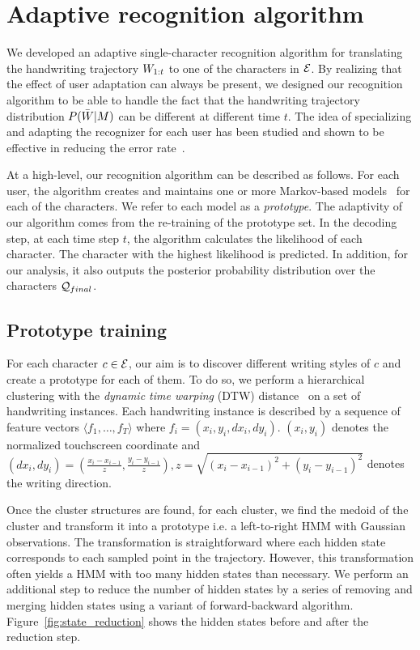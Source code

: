 \documentclass{sigchi}
\begin{document}
\section{Adaptive recognition algorithm}
\label{sec:recognition_algorithm}

We developed an adaptive single-character recognition algorithm for
translating the handwriting trajectory $W_{1:{t}}$ to one of the
characters in $\mathcal{E}$. By realizing that the effect of user
adaptation can always be present, we designed our recognition
algorithm to be able to handle the fact that the handwriting
trajectory distribution $P(\bar{W} | M)$ can be different at
different time $t$. The idea of specializing and adapting the
recognizer for each user has been studied and shown to be effective in
reducing the error rate~\cite{Connell2002, Matic93, Kienzle06}.

At a high-level, our recognition algorithm can be described as
follows. For each user, the algorithm creates and maintains one or
more Markov-based models~\cite{ThomasPloetz2011} for each of the
characters. We refer to each model as a {\em prototype}. The adaptivity
of our algorithm comes from the re-training of the prototype set. In
the decoding step, at each time step $t$, the algorithm calculates the
likelihood of each character. The character with the highest
likelihood is predicted. In addition, for our analysis, it also
outputs the posterior probability distribution over the characters
$\mathcal{Q}_{final}$.

\subsection{Prototype training}

For each character $c \in \mathcal{E}$, our aim is to discover
different writing styles of $c$ and create a prototype for each of
them. To do so, we perform a hierarchical clustering with the {\it
  dynamic time warping} (DTW) distance~\cite{Rabiner1993} on a set of
handwriting instances. Each handwriting instance is described by a
sequence of feature vectors $\langle f_1, \ldots, f_T \rangle$ where
$f_i = (x_i,y_i, dx_i,dy_i)$.  $(x_i,y_i)$ denotes the normalized
touchscreen coordinate and $(dx_i,dy_i) = (\frac{x_i - x_{i-1}}{z},
\frac{y_i - y_{i-1}}{z}) , z = \sqrt{(x_i - x_{i-1})^2 + (y_i -
  y_{i-1})^2}$ denotes the writing direction.

Once the cluster structures are found, for each cluster, we find the
medoid of the cluster and transform it into a prototype i.e. a
left-to-right HMM with Gaussian observations. The transformation is
straightforward where each hidden state corresponds to each sampled
point in the trajectory. However, this transformation often yields a
HMM with too many hidden states than necessary. We perform an additional
step to reduce the number of hidden states by a series of removing and
merging hidden states using a variant of forward-backward
algorithm. Figure~\ref{fig:state_reduction} shows the hidden states
before and after the reduction step.
\end{document}

